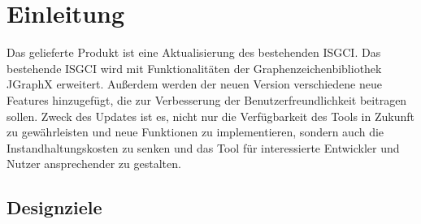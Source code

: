 \documentclass[10pt,a4paper]{article}
\begin{document}
\section{Einleitung}
Das gelieferte Produkt ist eine Aktualisierung des bestehenden ISGCI. Das bestehende ISGCI wird mit Funktionalitäten der Graphenzeichenbibliothek JGraphX erweitert. Außerdem werden der neuen Version verschiedene neue Features hinzugefügt, die zur Verbesserung der Benutzerfreundlichkeit beitragen sollen. Zweck des Updates ist es, nicht nur die Verfügbarkeit des Tools in Zukunft zu gewährleisten und neue Funktionen zu implementieren, sondern auch die Instandhaltungskosten zu senken und das Tool für interessierte Entwickler und Nutzer ansprechender zu gestalten.
\subsection{Designziele}
\end{document}
